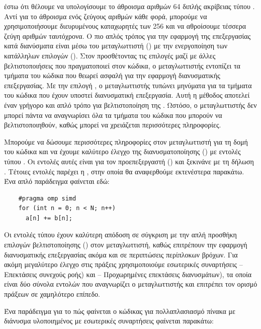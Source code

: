 έστω ότι θέλουμε να υπολογίσουμε το άθροισμα αριθμών 64 διπλής ακρίβειας τύπου . Αντί για το άθροισμα ενός ζεύγους αριθμών κάθε φορά, μπορούμε να χρησιμοποιήσουμε διευρυμένους καταχωρητές των 256 και να αθροίσουμε τέσσερα ζεύγη αριθμών ταυτόχρονα.
Ο πιο απλός τρόπος για την εφαρμογή της επεξεργασίας κατά διανύσματα είναι μέσω του μεταγλωττιστή () με την ενεργοποίηση των κατάλληλων επιλογών (). Στον  προσθέτοντας τις επιλογές  μαζί με άλλες βελτιστοποιήσεις που πραγματοποιεί στον κώδικα, ο μεταγλωττιστής εντοπίζει τα τμήματα του κώδικα που θεωρεί ασφαλή για την εφαρμογή διανυσματικής επεξεργασίας. Με την επιλογή , ο μεταγλωττιστής τυπώνει μηνύματα για τα τμήματα του κώδικα που έχουν υποστεί διανυσματική επεξεργασία. Αυτή η μέθοδος αποτελεί έναν γρήγορο και απλό τρόπο για βελτιστοποίηση της . Ωστόσο, ο μεταγλωττιστής δεν μπορεί πάντα να αναγνωρίσει όλα τα τμήματα του κώδικα που μπορούν να βελτιστοποιηθούν, καθώς μπορεί να χρειάζεται περισσότερες πληροφορίες.

Μπορούμε να δώσουμε περισσότερες πληροφορίες στον μεταγλωττιστή για τη δομή του κώδικα και να έχουμε καλύτερο έλεγχο της διανυσματοποίησης () με εντολές τύπου . Οι εντολές αυτές είναι για τον προεπεξεργαστή () και ξεκινάνε με τη δήλωση . Τέτοιες εντολές παρέχει η , στην οποία θα αναφερθούμε εκτενέστερα παρακάτω. Ένα απλό παράδειγμα φαίνεται εδώ:

\begin{verbatim}
    #pragma omp simd
    for (int n = 0; n < N; n++)
      a[n] += b[n];
\end{verbatim}

Οι εντολές τύπου  έχουν καλύτερη απόδοση σε σύγκριση με την απλή προσθήκη επιλογών βελτιστοποίησης () στον μεταγλωττιστή, καθώς επιτρέπουν την εφαρμογή διανυσματικής επεξεργασίας ακόμα και σε περιπτώσεις περίπλοκων βρόχων.
Για ακόμη μεγαλύτερο έλεγχο στις  πράξεις χρησιμοποιούμε εσωτερικές συναρτήσεις  – Επεκτάσεις  συνεχούς ροής) και  – Προχωρημένες επεκτάσεις διανυσμάτων), τα οποία είναι δύο σύνολα εντολών που αναγνωρίζει ο μεταγλωττιστής και επιτρέπει τον ορισμό πράξεων σε χαμηλότερο επίπεδο.

Ένα παράδειγμα για το πώς φαίνεται ο κώδικας για πολλαπλασιασμό πίνακα με διάνυσμα υλοποιημένος με εσωτερικές συναρτήσεις φαίνεται παρακάτω:
 
